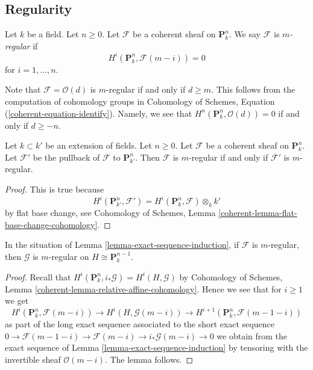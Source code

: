 \subsection{Regularity}
\label{subsection-regularity}

\begin{definition}
\label{definition-regularity}
Let $k$ be a field. Let $n \geq 0$. Let $\mathcal{F}$ be a coherent
sheaf on $\mathbf{P}^n_k$. We say $\mathcal{F}$ is {\it $m$-regular}
if
$$
H^i(\mathbf{P}^n_k, \mathcal{F}(m - i)) = 0
$$
for $i = 1, \ldots, n$.
\end{definition}

\noindent
Note that $\mathcal{F} = \mathcal{O}(d)$ is $m$-regular if and only
if $d \geq m$. This follows from the computation of cohomology groups
in Cohomology of Schemes, Equation (\ref{coherent-equation-identify}).
Namely, we see that $H^n(\mathbf{P}^n_k, \mathcal{O}(d)) = 0$
if and only if $d \geq -n$.

\begin{lemma}
\label{lemma-m-regular-extend-base-field}
Let $k \subset k'$ be an extension of fields. Let $n \geq 0$.
Let $\mathcal{F}$ be a coherent sheaf on $\mathbf{P}^n_k$.
Let $\mathcal{F}'$ be the pullback of $\mathcal{F}$ to $\mathbf{P}^n_{k'}$.
Then $\mathcal{F}$ is $m$-regular if and only if $\mathcal{F}'$ is
$m$-regular.
\end{lemma}

\begin{proof}
This is true because
$$
H^i(\mathbf{P}^n_{k'}, \mathcal{F}') =
H^i(\mathbf{P}^n_k, \mathcal{F}) \otimes_k k'
$$
by flat base change, see
Cohomology of Schemes, Lemma \ref{coherent-lemma-flat-base-change-cohomology}.
\end{proof}

\begin{lemma}
\label{lemma-m-regular}
In the situation of Lemma \ref{lemma-exact-sequence-induction},
if $\mathcal{F}$ is $m$-regular, then $\mathcal{G}$ is $m$-regular
on $H \cong \mathbf{P}^{n - 1}_k$.
\end{lemma}

\begin{proof}
Recall that $H^i(\mathbf{P}^n_k, i_*\mathcal{G}) = H^i(H, \mathcal{G})$ by
Cohomology of Schemes, Lemma \ref{coherent-lemma-relative-affine-cohomology}.
Hence we see that for $i \geq 1$ we get
$$
H^i(\mathbf{P}^n_k, \mathcal{F}(m - i)) \to
H^i(H, \mathcal{G}(m - i)) \to
H^{i + 1}(\mathbf{P}^n_k, \mathcal{F}(m - 1 - i))
$$
as part of the long exact sequence associated to the short exact sequence
$0 \to \mathcal{F}(m - 1 - i) \to \mathcal{F}(m - i)
\to i_*\mathcal{G}(m - i) \to 0$
we obtain from the exact sequence of
Lemma \ref{lemma-exact-sequence-induction} by tensoring with
the invertible sheaf $\mathcal{O}(m - i)$. The lemma follows.
\end{proof}

